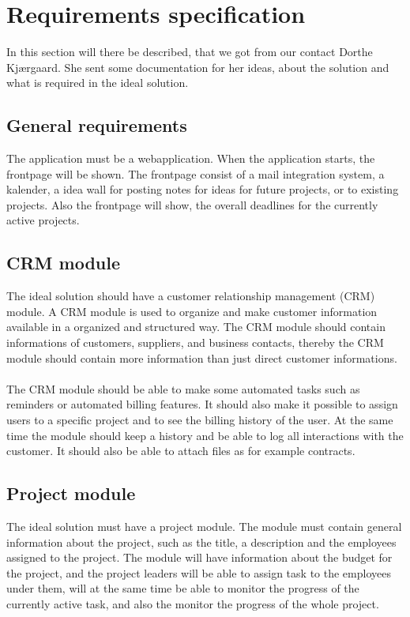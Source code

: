 \section{Requirements specification}
In this section will there be described, that we got from our contact Dorthe Kjærgaard. She sent some documentation for her ideas, about the solution and what is required in the ideal solution. 

\subsection{General requirements}
The application must be a webapplication. When the application starts, the frontpage will be shown. The frontpage consist of a mail integration system, a kalender, a idea wall for posting notes for ideas for future projects, or to existing projects. Also the frontpage will show, the overall deadlines for the currently active projects. 

\subsection{CRM module}
The ideal solution should have a customer relationship management (CRM) module. A CRM module is used to organize and make customer information available in a organized and structured way. The CRM module should contain informations of customers, suppliers, and business contacts, thereby the CRM module should contain more information than just direct customer informations.\\
\\
The CRM module should be able to make some automated tasks such as reminders or automated billing features. It should also make it possible to assign users to a specific project and to see the billing history of the user. At the same time the module should keep a history and be able to log all interactions with the customer. It should also be able to attach files as for example contracts.

\subsection{Project module}
The ideal solution must have a project module. The module must contain general information about the project, such as the title, a description and the employees assigned to the project. The module will have information about the budget for the project, and the project leaders will be able to assign task to the employees under them, will at the same time be able to monitor the progress of the currently active task, and also the monitor the progress of the whole project.

